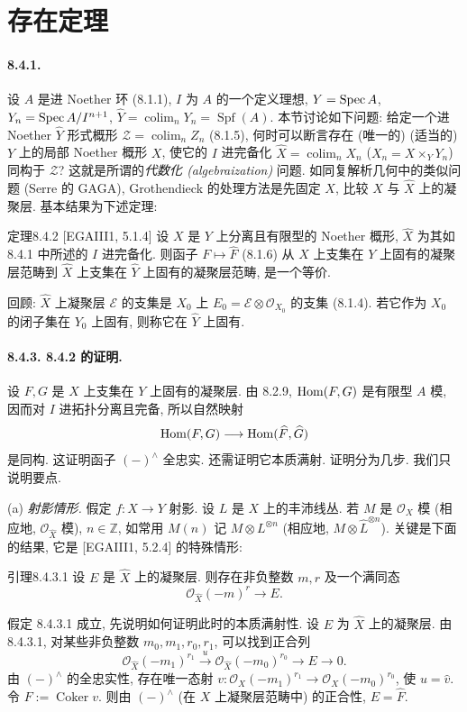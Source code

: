 \section{存在定理}\label{ch08:sec84}
\paragraph{8.4.1.}
设 $A$ 是进 Noether 环 (8.1.1), $I$ 为 $A$ 的一个定义理想, $Y=\operatorname{Spec} A$, $Y_n=\operatorname{Spec} A/I^{n+1}$, $\widehat Y=\operatorname{colim}_nY_n=\operatorname{Spf}(A)$. 本节讨论如下问题: 给定一个进 Noether $\widehat Y$ 形式概形 $\mathcal Z=\operatorname{colim}_n Z_n$ (8.1.5), 何时可以断言存在 (唯一的) (适当的) $Y$ 上的局部 Noether 概形 $X$, 使它的 $I$ 进完备化 $\widehat X=\operatorname{colim}_nX_n$ ($X_n=X\times_YY_n$) 同构于 $\mathcal Z$? 这就是所谓的\emph{代数化 (algebraization)} 问题. 如同复解析几何中的类似问题 (Serre 的 GAGA), Grothendieck 的处理方法是先固定 $X$, 比较 $X$ 与 $\widehat X$ 上的凝聚层. 基本结果为下述定理:

\begin{origstatement}{定理}{8.4.2}\label{ch08:th842}
[EGAIII1, 5.1.4] 设 $X$ 是 $Y$ 上分离且有限型的 Noether 概形, $\widehat X$ 为其如 8.4.1 中所述的 $I$ 进完备化. 则函子 $F\mapsto\widehat F$ (8.1.6) 从 $X$ 上支集在 $Y$ 上固有的凝聚层范畴到 $\widehat X$ 上支集在 $\widehat Y$ 上固有的凝聚层范畴, 是一个等价.
\end{origstatement}
回顾: $\widehat X$ 上凝聚层 $\mathcal E$ 的支集是 $X_0$ 上 $E_0=\mathcal E\otimes\mathcal O_{X_0}$ 的支集 (8.1.4). 若它作为 $X_0$ 的闭子集在 $Y_0$ 上固有, 则称它在 $\widehat Y$ 上固有.

\paragraph{8.4.3. 8.4.2 的证明.}
设 $F,G$ 是 $X$ 上支集在 $Y$ 上固有的凝聚层. 由 8.2.9, $\operatorname{Hom}(F,G)$ 是有限型 $A$ 模, 因而对 $I$ 进拓扑分离且完备, 所以自然映射
\[\operatorname{Hom}(F,G)\longrightarrow\operatorname{Hom}(\widehat F,\widehat G)\]
是同构. 这证明函子 $(-)^\wedge$ 全忠实. 还需证明它本质满射. 证明分为几步. 我们只说明要点.

(a) \emph{射影情形.} 假定 $f:X\to Y$ 射影. 设 $L$ 是 $X$ 上的丰沛线丛. 若 $M$ 是 $\mathcal O_X$ 模 (相应地, $\mathcal O_{\widehat X}$ 模), $n\in\mathbb Z$, 如常用 $M(n)$ 记 $M\otimes L^{\otimes n}$ (相应地, $M\otimes\widehat L^{\otimes n}$). 关键是下面的结果, 它是 [EGAIII1, 5.2.4] 的特殊情形:

\begin{origstatement}{引理}{8.4.3.1}\label{ch08:lem8431}
设 $E$ 是 $\widehat X$ 上的凝聚层. 则存在非负整数 $m,r$ 及一个满同态
\[\mathcal O_{\widehat X}(-m)^r\longrightarrow E.\]
\end{origstatement}
假定 8.4.3.1 成立, 先说明如何证明此时的本质满射性. 设 $E$ 为 $\widehat X$ 上的凝聚层. 由 8.4.3.1, 对某些非负整数 $m_0,m_1,r_0,r_1$, 可以找到正合列
\[\mathcal O_{\widehat X}(-m_1)^{r_1}\xrightarrow{u}\mathcal O_{\widehat X}(-m_0)^{r_0}\longrightarrow E\longrightarrow0.\]
由 $(-)^\wedge$ 的全忠实性, 存在唯一态射 $v:\mathcal O_X(-m_1)^{r_1}\to\mathcal O_X(-m_0)^{r_0}$, 使 $u=\widehat v$. 令 $F:=\operatorname{Coker}v$. 则由 $(-)^\wedge$ (在 $X$ 上凝聚层范畴中) 的正合性, $E=\widehat F$.

